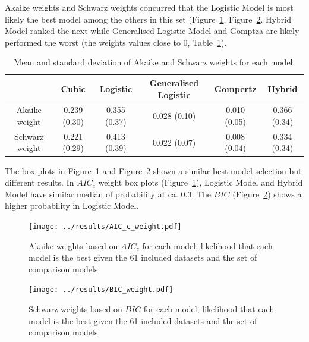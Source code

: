 \documentclass[a4paper]{report}
\begin{document}
\begin{linenumbers}
        Akaike weights and Schwarz weights concurred that the Logistic Model is most likely the best model among the others in this set (Figure~\ref{fig: AICc weight}, Figure~\ref{fig: BIC weight}. Hybrid Model ranked the next while Generalised Logistic Model and Gomptza are likely performed the worst (the weights values close to 0, Table~\ref{table: Akaike and Schwarz weights}).%
        \begin{table}[ht!]
        \caption{Mean and standard deviation of Akaike and Schwarz weights for each model.}
        \begin{center}
        \begin{tabular}{c||c|c|c|c|c}
             & Cubic & Logistic & Generalised Logistic & Gompertz & Hybrid\\
            \hline
            \hline
            Akaike weight & 0.239 (0.30) & 0.355 (0.37) & 0.028 (0.10) & 0.010 (0.05) & 0.366 (0.34) \\
            Schwarz weight & 0.221 (0.29) & 0.413 (0.39) & 0.022 (0.07) & 0.008 (0.04) & 0.334 (0.34)
        \end{tabular}
        \end{center}
        \label{table: Akaike and Schwarz weights}
        \end{table}

        The box plots in Figure~\ref{fig: AICc weight} and Figure~\ref{fig: BIC weight} shown a similar best model selection but different results. In $AIC_c$ weight box plots (Figure~\ref{fig: AICc weight}), Logistic Model and Hybrid Model have similar median of probability at ca. 0.3. The $BIC$ (Figure~\ref{fig: BIC weight}) shows a higher probability in Logistic Model.
        \begin{figure}[ht!]
            \centering
            \texttt{[image: ../results/AIC\_c\_weight.pdf]}
            \caption{Akaike weights based on $AIC_c$ for each model; likelihood that each model is the best given the 61 included datasets and the set of comparison models.}
            \label{fig: AICc weight}
        \end{figure}

        \begin{figure}[ht!]
            \centering
            \texttt{[image: ../results/BIC\_weight.pdf]}
            \caption{Schwarz weights based on $BIC$ for each model; likelihood that each model is the best given the 61 included datasets and the set of comparison models.}
            \label{fig: BIC weight}
        \end{figure}


\end{linenumbers}
\end{document}
